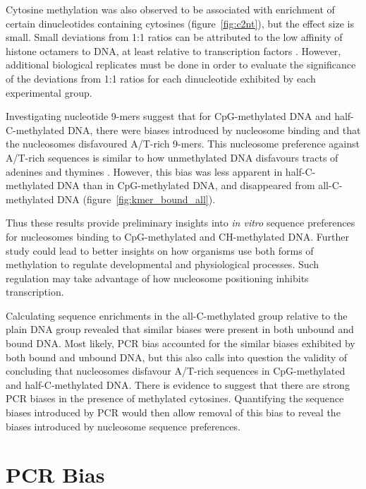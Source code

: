 \documentclass[parskip=full, numbers=noenddot]{scrreprt}
\begin{document}
Cytosine methylation was also observed to be associated with enrichment of certain dinucleotides containing cytosines (figure~\ref{fig:c2nt}), but the effect size is small.  Small deviations from 1:1 ratios can be attributed to the low affinity of histone octamers to DNA, at least relative to transcription factors \citep{struhl_determinants_2013}. %
However, additional biological replicates must be done in order to evaluate the significance of the deviations from 1:1 ratios for each dinucleotide exhibited by each experimental group.

Investigating nucleotide 9-mers suggest that for CpG-methylated DNA and half-C-methylated DNA, there were biases introduced by nucleosome binding and that the nucleosomes disfavoured A/T-rich 9-mers.  This nucleosome preference against A/T-rich sequences is similar to how unmethylated DNA disfavours tracts of adenines and thymines \citep{struhl_determinants_2013}. However, this bias was less apparent in half-C-methylated DNA than in CpG-methylated DNA, and disappeared from all-C-methylated DNA (figure~\ref{fig:kmer_bound_all}).

Thus these results provide preliminary insights into \emph{in vitro} sequence preferences for nucleosomes binding to CpG-methylated and CH-methylated DNA.  Further study could lead to better insights on how organisms use both forms of methylation to regulate developmental and physiological processes.  Such regulation may take advantage of how nucleosome positioning inhibits transcription.

Calculating sequence enrichments in the all-C-methylated group relative to the plain DNA group revealed that similar biases were present in both unbound and bound DNA.  Most likely, PCR bias accounted for the similar biases exhibited by both bound and unbound DNA, but this also calls into question the validity of concluding that nucleosomes disfavour A/T-rich sequences in CpG-methylated and half-C-methylated DNA.  There is evidence to suggest that there are strong PCR biases in the presence of methylated cytosines.  Quantifying the sequence biases introduced by PCR would then allow removal of this bias to reveal the biases introduced by nucleosome sequence preferences.

\chapter{PCR Bias}
\label{ch:pcrbias}
\end{document}
